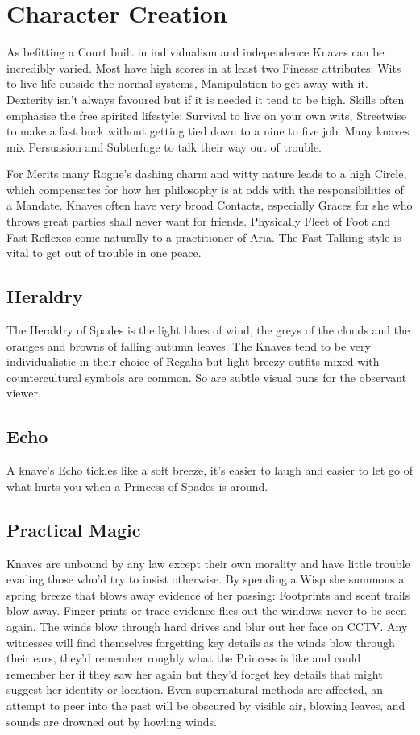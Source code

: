 \section*{Character Creation}

As befitting a Court built in individualism and independence Knaves can be incredibly varied. Most have high scores in at least two Finesse attributes: Wits to live life outside the normal systems, Manipulation to get away with it. Dexterity isn't always favoured but if it is needed it tend to be high. Skills often emphasise the free spirited lifestyle: Survival to live on your own wits, Streetwise to make a fast buck without getting tied down to a nine to five job. Many knaves mix Persuasion and Subterfuge to talk their way out of trouble.

For Merits many Rogue's dashing charm and witty nature leads to a high Circle, which compensates for how her philosophy is at odds with the responsibilities of a Mandate. Knaves often have very broad Contacts, especially Graces for she who throws great parties shall never want for friends. Physically Fleet of Foot and Fast Reflexes come naturally to a practitioner of Aria. The Fast-Talking style is vital to get out of trouble in one peace.

\subsection*{Heraldry}

The Heraldry of Spades is the light blues of wind, the greys of the clouds and the oranges and browns of falling autumn leaves. The Knaves tend to be very individualistic in their choice of Regalia but light breezy outfits mixed with countercultural symbols are common. So are subtle visual puns for the observant viewer. 

\subsection*{Echo}

A knave's Echo tickles like a soft breeze, it's easier to laugh and easier to let go of what hurts you when a Princess of Spades is around. 

\subsection*{Practical Magic}

Knaves are unbound by any law except their own morality and have little trouble evading those who'd try to insist otherwise. By spending a Wisp she summons a spring breeze that blows away evidence of her passing: Footprints and scent trails blow away. Finger prints or trace evidence flies out the windows never to be seen again. The winds blow through hard drives and blur out her face on CCTV. Any witnesses will find themselves forgetting key details as the winds blow through their ears, they'd remember roughly what the Princess is like and could remember her if they saw her again but they'd forget key details that might suggest her identity or location. Even supernatural methods are affected, an attempt to peer into the past will be obscured by visible air, blowing leaves, and sounds are drowned out by howling winds.

